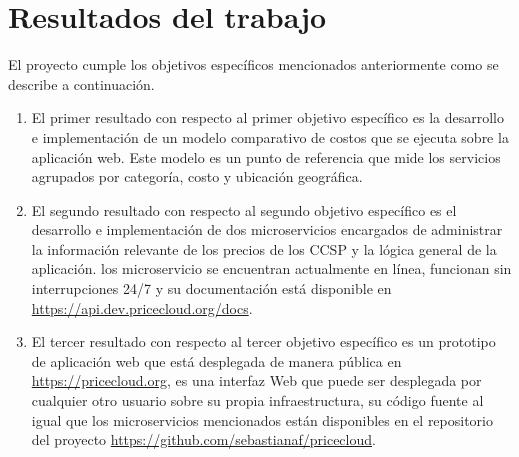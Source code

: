 \chapter{Resultados del trabajo} %

\label{ch:resultados} %



El proyecto cumple los objetivos específicos mencionados anteriormente como se describe a continuación.


\begin{enumerate}
  \item El primer resultado con respecto al primer objetivo específico es la desarrollo e implementación de un modelo comparativo de costos que se ejecuta sobre la aplicación web. Este modelo es un punto de referencia que mide los servicios agrupados por categoría, costo y ubicación geográfica.

  \item El segundo resultado con respecto al segundo objetivo específico es el desarrollo e implementación de dos microservicios encargados de administrar la información relevante de los precios de los \acrshort{CCSP} y la lógica general de la aplicación. los microservicio se encuentran actualmente en línea, funcionan sin interrupciones 24/7 y su documentación está disponible en \url{https://api.dev.pricecloud.org/docs}.

  \item El tercer resultado con respecto al tercer objetivo específico es un prototipo de aplicación web que está desplegada de manera pública en \url{https://pricecloud.org}, es una interfaz Web que puede ser desplegada por cualquier otro usuario sobre su propia infraestructura, su código fuente al igual que los microservicios mencionados están disponibles en el repositorio del proyecto \url{https://github.com/sebastianaf/pricecloud}.

\end{enumerate}



